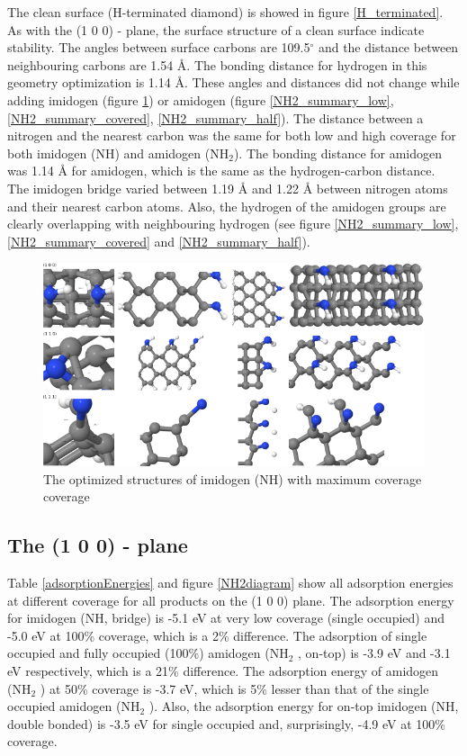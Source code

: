 \documentclass[12pt,a4paper]{article}
\begin{document}
The clean surface (H-terminated diamond) is showed in figure \ref{H_terminated}. As with the (1 0 0) - plane, the surface structure of a clean surface indicate stability. The angles between surface carbons are 109.5$^{\circ}$ and the distance between neighbouring carbons are 1.54 Å. The bonding distance for hydrogen in this geometry optimization is 1.14 Å. These angles and distances did not change while adding imidogen (figure \ref{NHbridge_summary}) or amidogen (figure \ref{NH2_summary_low},   \ref{NH2_summary_covered}, \ref{NH2_summary_half}). The distance between a nitrogen and the nearest carbon was the same for both low and high coverage for both imidogen (NH) and amidogen (NH$_2$). The bonding distance for amidogen was 1.14 Å for amidogen, which is the same as the hydrogen-carbon distance. The imidogen bridge varied between 1.19 Å and 1.22 Å between nitrogen atoms and their nearest carbon atoms. Also, the hydrogen of the amidogen groups are clearly overlapping with neighbouring hydrogen (see figure \ref{NH2_summary_low}, \ref{NH2_summary_covered} and \ref{NH2_summary_half}).

\begin{figure} \captionsetup{width=.8\linewidth} \caption{The optimized structures of imidogen (NH) with maximum coverage coverage} \label{NHbridge_summary}
%
\includegraphics[width=.8\linewidth]{pictures/NHbridge_summary.png}
\end{figure}


\subsection{The (1 0 0) - plane}
Table \ref{adsorptionEnergies} and figure \ref{NH2diagram} show all adsorption energies at different coverage for all products on the (1 0 0) plane. The adsorption energy for imidogen (NH, bridge) is -5.1 eV at very low coverage (single occupied) and -5.0 eV at 100\% coverage, which is a 2\% difference. The adsorption of single occupied and fully occupied (100\%) amidogen (NH$_2$ , on-top) is -3.9 eV and -3.1 eV respectively, which is a 21\% difference. The adsorption energy of amidogen (NH$_2$ ) at 50\% coverage is -3.7 eV, which is 5\% lesser than that of the single occupied amidogen (NH$_2$ ). Also, the adsorption energy for on-top imidogen (NH, double bonded) is -3.5 eV for single occupied and, surprisingly, -4.9 eV at 100\% coverage. 
\end{document}
